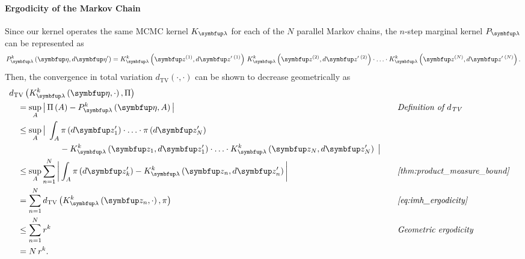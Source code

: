 \begin{proofEnd}
  \paragraph{Ergodicity of the Markov Chain}
  Since our kernel operates the same MCMC kernel \(K_{\vlambda}\) for each of the \(N\) parallel Markov chains, the \(n\)-step marginal kernel \(P_{\vlambda}\) can be represented as
  \begin{align*}
    P_{\vlambda}^k\left(\veta, d\veta^{\prime}\right)
    = 
    K_{\vlambda}^k\left(\vz^{(1)}, d\vz^{\prime\; (1)}\right)
    \,
    K_{\vlambda}^k\left(\vz^{(2)}, d\vz^{\prime\; (2)}\right)
    \cdot
    \ldots 
    \cdot
    K_{\vlambda}^k\left(\vz^{(N)}, d\vz^{\prime\; (N)}\right).
  \end{align*}
  Then, the convergence in total variation \(d_{\mathrm{TV}}\left(\cdot, \cdot\right)\) can be shown to decrease geometrically as
  \begin{alignat}{2}
    &\DTV{K^{k}_{\vlambda}\left(\veta, \cdot\right)}{\Pi}
    \nonumber
    \\
    &\quad=
    \sup_{A}
    \abs{
      \Pi\left(A\right)
      -
      P^{k}_{\vlambda}\left(\veta, A\right)
    }
    &&\quad\text{\textit{Definition of \(d_{\text{TV}}\)}}
    \nonumber
    \\
    &\quad\leq
    \sup_{A}
    \big|\;
    \int_{A}
      \pi\left(d\vz^{\prime}_1\right) \cdot \ldots \cdot \pi\left(d\vz^{\prime}_N\right)
    \nonumber
      \\
      &\qquad\qquad\qquad-
      K^k_{\vlambda}\left(\vz_1, d\vz^{\prime}_1\right) \cdot \ldots \cdot K^k_{\vlambda}\left(\vz_N, d\vz^{\prime}_N\right)
    \;\big|
    \nonumber
    \\
    &\quad\leq
    \sup_{A}
    \sum_{n=1}^N
    \abs{
    \int_{A}
      \pi\left(d\vz^{\prime}_k\right) - K^{k}_{\vlambda}\left(\vz_n, d\vz^{\prime}_n\right) 
    }
    &&\quad\text{\textit{\cref{thm:product_measure_bound}}}
    \nonumber
    \\
    &\quad=
    \sum_{n=1}^N
    \DTV{K^k_{\vlambda}\left(\vz_n, \cdot\right)}{\pi}
    &&\quad\text{\textit{\cref{eq:imh_ergodicity}}}
    \nonumber
    \\
    &\quad\leq
    \sum_{n=1}^N
    r^{k}
    &&\quad\text{\textit{Geometric ergodicity}}
    \nonumber
    \\
    &\quad=
    N\,r^{k}.
    \nonumber
  \end{alignat}


\end{proofEnd}
